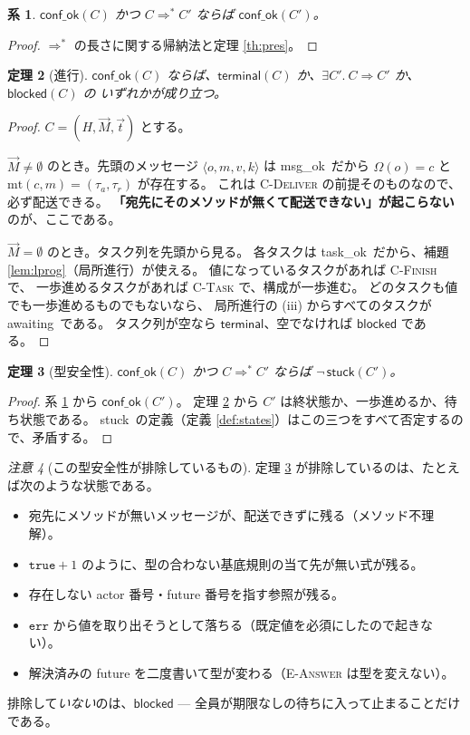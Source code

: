 \documentclass[11pt,a4paper]{ltjsarticle}
\newtheorem{theorem}{定理}
\newtheorem{corollary}[theorem]{系}
\theoremstyle{definition}
\theoremstyle{remark}
\newtheorem{remark}[theorem]{注意}
\newcommand{\Om}{\Omega}
\newcommand{\mtab}{\mathrm{mt}}
\newcommand{\msgok}{\textsf{msg\_ok}}
\newcommand{\taskok}{\textsf{task\_ok}}
\newcommand{\confok}{\textsf{conf\_ok}}
\newcommand{\stuck}{\textsf{stuck}}
\newcommand{\blocked}{\textsf{blocked}}
\newcommand{\terminal}{\textsf{terminal}}
\newcommand{\awaiting}{\textsf{awaiting}}
\newcommand{\cstep}{\Longrightarrow}
\begin{document}
\begin{corollary}\label{th:presstar}
$\confok(C)$ かつ $C \cstep^{*} C'$ ならば $\confok(C')$。
\end{corollary}

\begin{proof}
$\cstep^{*}$ の長さに関する帰納法と定理 \ref{th:pres}。
\end{proof}

\begin{theorem}[進行]\label{th:prog}
$\confok(C)$ ならば、$\terminal(C)$ か、$\exists C'.\ C \cstep C'$ か、$\blocked(C)$ の
いずれかが成り立つ。
\end{theorem}

\begin{proof}
$C = (H,\vec{M},\vec{t})$ とする。

$\vec{M} \neq \emptyset$ のとき。先頭のメッセージ $\langle o,m,v,k\rangle$ は \msgok\ だから
$\Om(o) = c$ と $\mtab(c,m) = (\tau_a,\tau_r)$ が存在する。
これは \textsc{C-Deliver} の前提そのものなので、必ず配送できる。
\textbf{「宛先にそのメソッドが無くて配送できない」が起こらない}のが、ここである。

$\vec{M} = \emptyset$ のとき。タスク列を先頭から見る。
各タスクは \taskok\ だから、補題 \ref{lem:lprog}（局所進行）が使える。
値になっているタスクがあれば \textsc{C-Finish} で、
一歩進めるタスクがあれば \textsc{C-Task} で、構成が一歩進む。
どのタスクも値でも一歩進めるものでもないなら、
局所進行の (iii) からすべてのタスクが \awaiting\ である。
タスク列が空なら $\terminal$、空でなければ $\blocked$ である。
\end{proof}

\begin{theorem}[型安全性]\label{th:safety}
$\confok(C)$ かつ $C \cstep^{*} C'$ ならば $\neg\,\stuck(C')$。
\end{theorem}

\begin{proof}
系 \ref{th:presstar} から $\confok(C')$。
定理 \ref{th:prog} から $C'$ は終状態か、一歩進めるか、待ち状態である。
\stuck\ の定義（定義 \ref{def:states}）はこの三つをすべて否定するので、矛盾する。
\end{proof}

\begin{remark}[この型安全性が排除しているもの]
定理 \ref{th:safety} が排除しているのは、たとえば次のような状態である。
\begin{itemize}\itemsep1pt
\item 宛先にメソッドが無いメッセージが、配送できずに残る（メソッド不理解）。
\item $\mathtt{true} + 1$ のように、型の合わない基底規則の当て先が無い式が残る。
\item 存在しない actor 番号・future 番号を指す参照が残る。
\item $\mathtt{err}$ から値を取り出そうとして落ちる（既定値を必須にしたので起きない）。
\item 解決済みの future を二度書いて型が変わる（\textsc{E-Answer} は型を変えない）。
\end{itemize}
排除して\emph{いない}のは、$\blocked$ ---
全員が期限なしの待ちに入って止まることだけである。
\end{remark}
\end{document}
